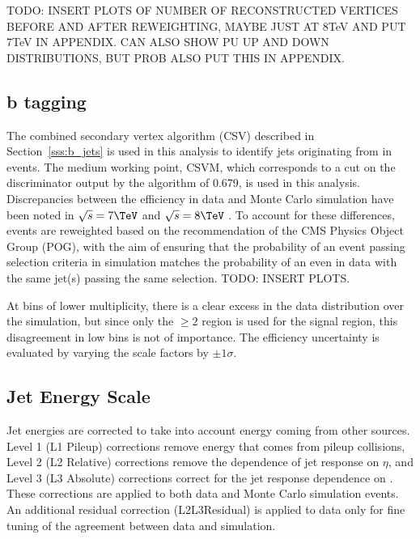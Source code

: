 TODO: INSERT PLOTS OF NUMBER OF RECONSTRUCTED VERTICES BEFORE AND AFTER REWEIGHTING, MAYBE JUST AT 8TeV AND
PUT 7TeV IN APPENDIX. CAN ALSO SHOW PU UP AND DOWN DISTRIBUTIONS, BUT PROB ALSO PUT THIS IN APPENDIX.

\subsection{b tagging}
\label{ss:b_tagging}
The combined secondary vertex \btagging algorithm (CSV) described in Section~\ref{sss:b_jets} is used in this
analysis to identify jets originating from \bquarks in \ttbar events. The medium working point, CSVM, which
corresponds to a cut on the discriminator output by the algorithm of 0.679, is used in this analysis.
Discrepancies between the \btagging efficiency in data and Monte Carlo simulation have been noted in
$\sqrt{s}=7\TeV$ \cite{CMS-PAS-BTV-11-004} and $\sqrt{s}=8\TeV$ \cite{CMS-DP-2013-005}. To account for these
differences, events are reweighted based on the recommendation of the CMS \btagging Physics Object Group
(POG), with the aim of ensuring that the probability of an event passing selection criteria in simulation
matches the probability of an even in data with the same jet(s) passing the same selection. TODO: INSERT
PLOTS.

At bins of lower multiplicity, there is a clear excess in the data distribution over the simulation, but since
only the $\geq2$ \btags region is used for the signal region, this disagreement in low bins is not of
importance.  %
The \btagging efficiency uncertainty is evaluated by varying the scale factors by $\pm1\sigma$.

\subsection{Jet Energy Scale}
\label{sss:jet_energy_scale}
Jet energies are corrected to take into account energy coming from other sources. Level 1 (L1 Pileup)
corrections remove energy that comes from pileup collisions, Level 2 (L2 Relative) corrections remove the
dependence of jet response on $\eta$, and Level 3 (L3 Absolute) corrections correct for the jet response
dependence on \pt \cite{Chatrchyan:2011ds}. These corrections are applied to both data and Monte Carlo
simulation events. An additional residual correction (L2L3Residual) is applied to data only for fine tuning of the agreement between data and
simulation.

